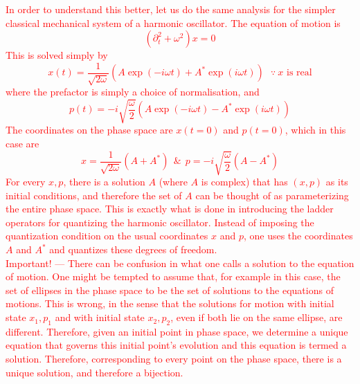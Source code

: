 \documentclass[11pt, notitlepage]{report}
\newcommand{\del}{\partial}
\newcommand{\w}{\omega}
\numberwithin{equation}{section}
\begin{document}
    \textcolor{red}{
        In order to understand this better, let us do the same analysis for the simpler classical mechanical system of a harmonic oscillator. The equation of motion is 
        \begin{equation*}
            ( \del_t^2 + \w^2 )x = 0
        \end{equation*} This is solved simply by 
        \begin{equation*}
            x(t) = \frac{1}{\sqrt{2\w}}\left(A\exp(-i\w t) + A^*\exp(i\w t)\right) ~~~\because~x\text{ is real}
        \end{equation*}
        where the prefactor is simply a choice of normalisation, and 
        \begin{equation*}
            p(t) = -i\sqrt{\frac{\w}{2}} (A\exp(-i\w t) - A^* \exp(i \w t))
        \end{equation*}
        The coordinates on the phase space are \(x(t=0)\) and \(p(t=0)\), which in this case are 
        \begin{equation*}
            x = \frac{1}{\sqrt{2\w}}(A + A^*)~~\&~~p = -i\sqrt{\frac{\w}{2}} (A - A^*)
        \end{equation*}
        For every \(x, p\), there is a solution \(A\) (where \(A\) is complex) that has \((x,p)\) as its initial conditions, and therefore the set of \(A\) can be thought of as parameterizing the entire phase space. This is exactly what is done in introducing the ladder operators for quantizing the harmonic oscillator. Instead of imposing the quantization condition on the usual coordinates \(x\) and \(p\), one uses the coordinates \(A\) and \(A^*\) and quantizes these degrees of freedom. \\
        Important! — There can be confusion in what one calls a solution to the equation of motion. One might be tempted to assume that, for example in this case, the set of ellipses in the phase space to be the set of solutions to the equations of motions. This is wrong, in the sense that the solutions for motion with initial state \(x_1, p_1\) and with initial state \(x_2, p_2\), even if both lie on the same ellipse, are different. Therefore, given an initial point in phase space, we determine a unique equation that governs this initial point's evolution and this equation is termed a solution. Therefore, corresponding to every point on the phase space, there is a unique solution, and therefore a bijection.  \\      
        }
\end{document}
